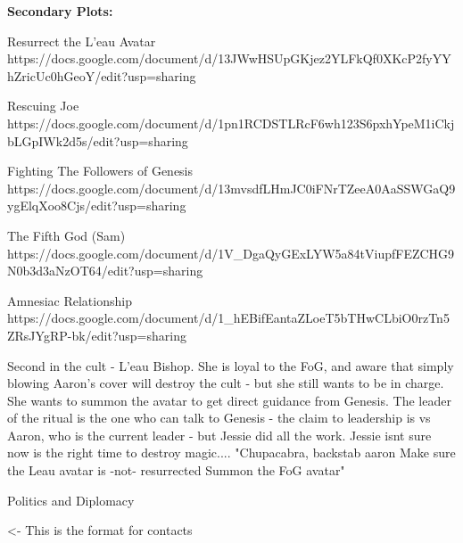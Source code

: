 \documentclass[char]{GL2020}
\begin{document}
\textbf{Secondary Plots:}

Resurrect the L'eau Avatar https://docs.google.com/document/d/13JWwHSUpGKjez2YLFkQf0XKcP2fyYYhZricUc0hGeoY/edit?usp=sharing

Rescuing Joe https://docs.google.com/document/d/1pn1RCDSTLRcF6wh123S6pxhYpeM1iCkjbLGpIWk2d5s/edit?usp=sharing

Fighting The Followers of Genesis https://docs.google.com/document/d/13mvsdfLHmJC0iFNrTZeeA0AaSSWGaQ9ygElqXoo8Cjs/edit?usp=sharing

The Fifth God (Sam) https://docs.google.com/document/d/1V_DgaQyGExLYW5a84tViupfFEZCHG9N0b3d3aNzOT64/edit?usp=sharing

Amnesiac Relationship https://docs.google.com/document/d/1_hEBifEantaZLoeT5bTHwCLbiO0rzTn5ZRsJYgRP-bk/edit?usp=sharing


Second in the cult - L'eau Bishop. She is loyal to the FoG, and aware that simply blowing Aaron's cover will destroy the cult - but she still wants to be in charge. She wants to summon the avatar to get direct guidance from Genesis. The leader of the ritual is the one who can talk to Genesis - the claim to leadership is vs Aaron, who is the current leader - but Jessie did all the work. Jessie isnt sure now is the right time to destroy magic....		"Chupacabra, backstab aaron
Make sure the Leau avatar is -not- resurrected
Summon the FoG avatar"	

Politics and Diplomacy

\begin{itemz}[Goals]
	\item 
\end{itemz}

\begin{itemz}[Notes]
	\item 
\end{itemz}

\begin{contacts}
	\contact{\cTest{}} <- This is the format for contacts 
\end{contacts}
\end{document}
